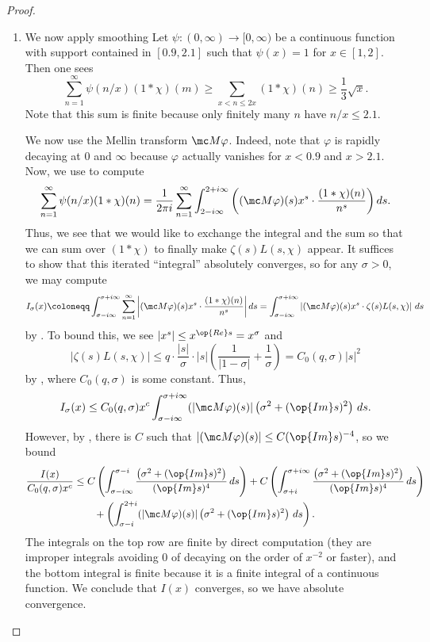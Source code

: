 \documentclass[../notes.tex]{subfiles}
\begin{document}
\begin{proof}
\begin{enumerate}
		\item We now apply smoothing Let $\psi\colon(0,\infty)\to[0,\infty)$ be a continuous function with support contained in $[0.9,2.1]$ such that $\psi(x)=1$ for $x\in[1,2]$. Then one sees
		\[\sum_{n=1}^\infty\psi(n/x)(1*\chi)(m)\ge\sum_{x<n\le2x}(1*\chi)(n)\ge\frac13\sqrt x.\]
		Note that this sum is finite because only finitely many $n$ have $n/x\le2.1$.
	
		We now use the Mellin transform $\mc M\varphi$. Indeed, note that $\varphi$ is rapidly decaying at $0$ and $\infty$ because $\varphi$ actually vanishes for $x<0.9$ and $x>2.1$. Now, we use  to compute
		\[\sum_{n=1}^\infty\psi(n/x)(1*\chi)(n)=\frac1{2\pi i}\sum_{n=1}^\infty\int_{2-i\infty}^{2+i\infty}\left((\mc M\varphi)(s)x^{s}\cdot\frac{(1*\chi)(n)}{n^s}\right)ds.\]
		Thus, we see that we would like to exchange the integral and the sum so that we can sum over $(1*\chi)$ to finally make $\zeta(s)L(s,\chi)$ appear. It suffices to show that this iterated ``integral'' absolutely converges, so for any $\sigma>0$, we may compute
		\[I_\sigma(x)\coloneqq\int_{\sigma-i\infty}^{\sigma+i\infty}\sum_{n=1}^\infty\left|(\mc M\varphi)(s)x^{s}\cdot\frac{(1*\chi)(n)}{n^s}\right|ds=\int_{\sigma-i\infty}^{\sigma+i\infty}\left|(\mc M\varphi)(s)x^s\cdot\zeta(s)L(s,\chi)\right|\,ds\]
		by . To bound this, we see $\left|x^s\right|\le x^{\op{Re}s}=x^\sigma$ and
		\[|\zeta(s)L(s,\chi)|\le q\cdot\frac{|s|}\sigma\cdot|s|\left(\frac1{|1-\sigma|}+\frac1\sigma\right)=C_0(q,\sigma)|s|^2\]
		by , where $C_0(q,\sigma)$ is some constant. Thus,
		\[I_\sigma(x)\le C_0(q,\sigma)x^c\int_{\sigma-i\infty}^{\sigma+i\infty}(|\mc M\varphi)(s)|\left(\sigma^2+(\op{Im}s)^2\right)\,ds.\]
		However, by , there is $C$ such that $|(\mc M\varphi)(s)|\le C(\op{Im}s)^{-4}$, so we bound
		\begin{align*}
			\frac{I(x)}{C_0(q,\sigma)x^c} &\le 
			C\left(\int_{\sigma-i\infty}^{\sigma-i}\frac{\left(\sigma^2+(\op{Im}s)^2\right)}{(\op{Im}s)^4}\,ds\right)
			+C\left(\int_{\sigma+i}^{\sigma+i\infty}\frac{\left(\sigma^2+(\op{Im}s)^2\right)}{(\op{Im}s)^4}\,ds\right) \\
			&\qquad+\left(\int_{\sigma-i}^{2+i}(|\mc M\varphi)(s)|\left(\sigma^2+(\op{Im}s)^2\right)\,ds\right).
		\end{align*}
		The integrals on the top row are finite by direct computation (they are improper integrals avoiding $0$ of decaying on the order of $x^{-2}$ or faster), and the bottom integral is finite because it is a finite integral of a continuous function. We conclude that $I(x)$ converges, so we have absolute convergence.
		

\end{enumerate}
\end{proof}
\end{document}
